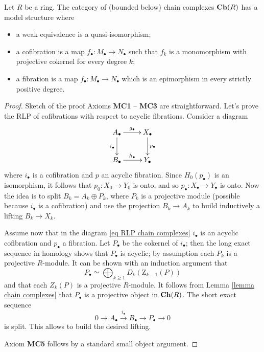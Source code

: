 \begin{refsection}
\begin{thm}
Let $R$ be a ring. The category of (bounded below) chain complexes $\mathbf{Ch}(R)$ has a model structure where
\begin{itemize}
\item a weak equivalence is a quasi-isomorphism;
\item a cofibration is a map $f_\bullet \colon M_\bullet \to N_\bullet$ such that $f_k$ is a monomorphism with projective cokernel for every degree $k$;
\item a fibration is a map $f_\bullet \colon M_\bullet \to N_\bullet$ which is an epimorphism in every strictly positive degree.
\end{itemize}
\end{thm}

\begin{proof}{Sketch of the proof}
Axioms {\bfseries MC1} -- {\bfseries MC3} are straightforward. Let's prove the RLP of cofibrations with respect to acyclic fibrations. Consider a diagram
\begin{equation} \label{eq RLP chain complexes}
\xymatrix{
A_\bullet \ar[r]^{g_\bullet} \ar[d]_{i_\bullet} & X_\bullet \ar[d]^{p_\bullet} \\ B_\bullet \ar[r]^{h_\bullet} & Y_\bullet
}
\end{equation}
where $i_\bullet$ is a cofibration and $p$ an acyclic fibration. Since $H_0(p_\bullet)$ is an isomorphism, it follows that $p_0 \colon X_0 \to Y_0$ is onto, and so $p_\bullet \colon X_\bullet \to Y_\bullet$ is onto. Now the idea is to split $B_k = A_k \oplus P_k$, where $P_k$ is a projective module (possible because $i_\bullet$ is a cofibration) and use the projection $B_k \to A_k$ to build inductively a lifting $B_k \to X_k$.

Assume now that in the diagram \eqref{eq RLP chain complexes} $i_\bullet$ is an acyclic cofibration and $p_\bullet$ a fibration. Let $P_\bullet$ be the cokernel of $i_\bullet$; then the long exact sequence in homology shows that $P_\bullet$ is acyclic; by assumption each $P_k$ is a projective $R$-module. It can be shown with an induction argument that
\[
P_\bullet \simeq \bigoplus_{k \ge 1} D_k(\mathrm{Z}_{k-1}(P))
\]
and that each $Z_k(P)$ is a projective $R$-module. It follows from Lemma \ref{lemma chain complexes} that $P_\bullet$ is a projective object in $\mathbf{Ch}(R)$. The short exact sequence
\[
0 \to A_\bullet \xrightarrow{i_\bullet} B_\bullet \to P_\bullet \to 0
\]
is split. This allows to build the desired lifting.

Axiom {\bfseries MC5} follows by a standard small object argument.
\end{proof}


\end{refsection}
